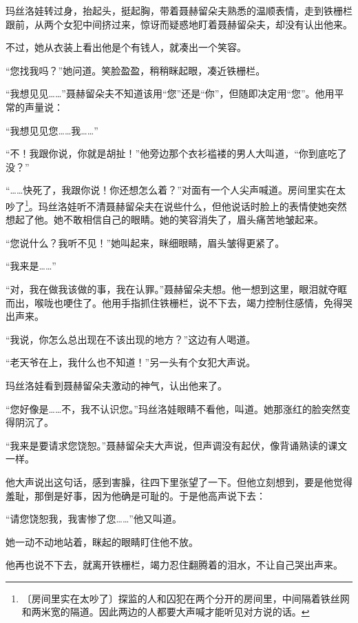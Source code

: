 \documentclass[12pt,UTF-8,openany]{ctexbook}
\begin{document}
\begin{normalsize}
    
    玛丝洛娃转过身，抬起头，挺起胸，带着聂赫留朵夫熟悉的温顺表情，走到铁栅栏跟前，从两个女犯中间挤过来，惊讶而疑惑地盯着聂赫留朵夫，却没有认出他来。
    
    不过，她从衣装上看出他是个有钱人，就凑出一个笑容。
    
    “您找我吗？”她问道。笑脸盈盈，稍稍眯起眼，凑近铁栅栏。
    
    “我想见见……”聂赫留朵夫不知道该用“您”还是“你”，但随即决定用“您”。他用平常的声量说：
    
    “我想见见您……我……”
    
    “不！我跟你说，你就是胡扯！”他旁边那个衣衫褴褛的男人大叫道，“你到底吃了没？”
    
    “……快死了，我跟你说！你还想怎么着？”对面有一个人尖声喊道。房间里实在太吵了\footnote{〔房间里实在太吵了〕探监的人和囚犯在两个分开的房间里，中间隔着铁丝网和两米宽的隔道。因此两边的人都要大声喊才能听见对方说的话。}。玛丝洛娃听不清聂赫留朵夫在说些什么，但他说话时脸上的表情使她突然想起了他。她不敢相信自己的眼睛。她的笑容消失了，眉头痛苦地皱起来。
    
    “您说什么？我听不见！”她叫起来，眯细眼睛，眉头皱得更紧了。
    
    “我来是……”
    
    “对，我在做我该做的事，我在认罪。”聂赫留朵夫想。他一想到这里，眼泪就夺眶而出，喉咙也哽住了。他用手指抓住铁栅栏，说不下去，竭力控制住感情，免得哭出声来。
    
    “我说，你怎么总出现在不该出现的地方？”这边有人喝道。
    
    “老天爷在上，我什么也不知道！”另一头有个女犯大声说。
    
    玛丝洛娃看到聂赫留朵夫激动的神气，认出他来了。
    
    “您好像是……不，我不认识您。”玛丝洛娃眼睛不看他，叫道。她那涨红的脸突然变得阴沉了。
    
    “我来是要请求您饶恕。”聂赫留朵夫大声说，但声调没有起伏，像背诵熟读的课文一样。
    
    他大声说出这句话，感到害臊，往四下里张望了一下。但他立刻想到，要是他觉得羞耻，那倒是好事，因为他确是可耻的。于是他高声说下去：
    
    “请您饶恕我，我害惨了您……”他又叫道。
    
    她一动不动地站着，眯起的眼睛盯住他不放。
    
    他再也说不下去，就离开铁栅栏，竭力忍住翻腾着的泪水，不让自己哭出声来。
    

\end{normalsize}
\end{document}
